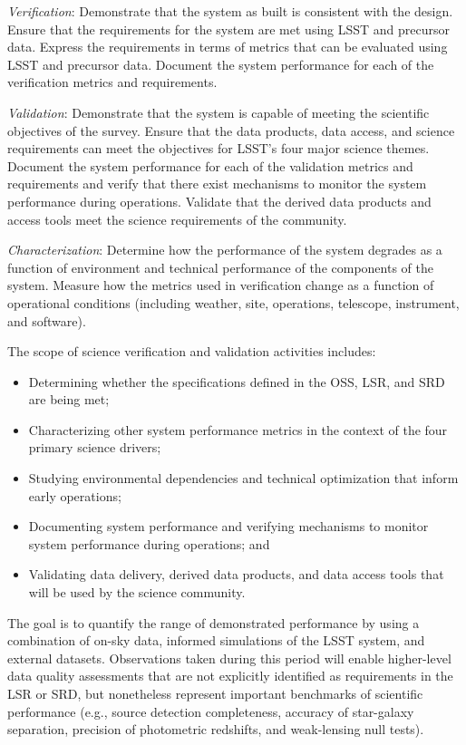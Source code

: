 {\it Verification}: Demonstrate that the system as built is consistent with the design. Ensure that the requirements for the system are met using LSST and precursor data. Express the requirements in terms of metrics that can be evaluated using LSST and precursor data. Document the system performance for each of the verification metrics and requirements.

{\it Validation}: Demonstrate that the system is capable of meeting the scientific objectives of the survey. Ensure that the data products, data access, and science requirements can meet the objectives for LSST’s four major science themes. Document the system performance for each of the validation metrics and requirements and verify that there exist mechanisms to monitor the system performance during operations. Validate that the derived data products and access tools meet the science requirements of the community.

{\it Characterization}: Determine how the performance of the system degrades as a function of environment and technical performance of the components of the system. Measure how the metrics used in verification change as a function of operational conditions (including weather, site, operations, telescope, instrument, and software).

The scope of science verification and validation activities includes:

\begin{itemize}

	\item Determining whether the specifications defined in the OSS, LSR, and SRD are being met;
	\item Characterizing other system performance metrics in the context of the four primary science drivers;
	\item Studying environmental dependencies and technical optimization that inform early operations;
	\item Documenting system performance and verifying mechanisms to monitor system performance during operations; and
	\item Validating data delivery, derived data products, and data access tools that will be used by the science community.
	
\end{itemize}

The goal is to quantify the range of demonstrated performance by using a combination of on-sky data, informed simulations of the LSST system, and external datasets. Observations taken during this period will enable higher-level data quality assessments that are not explicitly identified as requirements in the LSR or SRD, but nonetheless represent important benchmarks of scientific performance (e.g., source detection completeness, accuracy of star-galaxy separation, precision of photometric redshifts, and weak-lensing null tests). 

